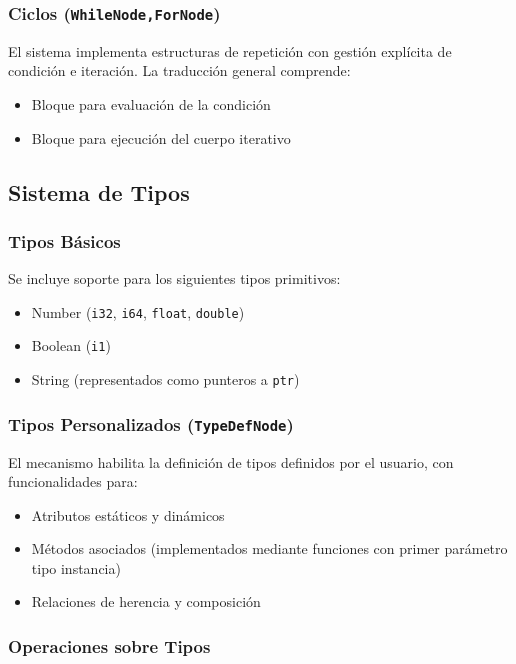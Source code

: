 \documentclass{article}
\begin{document}
\subsubsection{Ciclos (\texttt{WhileNode,ForNode})}

El sistema implementa estructuras de repetición con gestión explícita de condición e iteración. La traducción general comprende:
\begin{itemize}
    \item Bloque para evaluación de la condición
    \item Bloque para ejecución del cuerpo iterativo
\end{itemize}

\subsection{Sistema de Tipos}

\subsubsection{Tipos Básicos}

Se incluye soporte para los siguientes tipos primitivos:
\begin{itemize}
    \item Number (\texttt{i32}, \texttt{i64}, \texttt{float}, \texttt{double})
    \item Boolean (\texttt{i1})
    \item String (representados como punteros a \texttt{ptr})
\end{itemize}

\subsubsection{Tipos Personalizados (\texttt{TypeDefNode})}

El mecanismo habilita la definición de tipos definidos por el usuario, con funcionalidades para:
\begin{itemize}
    \item Atributos estáticos y dinámicos
    \item Métodos asociados (implementados mediante funciones con primer parámetro tipo instancia)
    \item Relaciones de herencia y composición
\end{itemize}

\subsubsection{Operaciones sobre Tipos}
\end{document}
